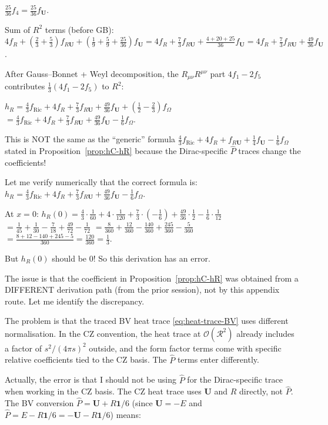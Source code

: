 \documentclass[11pt,a4paper]{article}
\newcommand{\Id}{\mathbf{1}}
\newcommand{\Ricsq}{R_{\mu\nu}R^{\mu\nu}}
\theoremstyle{definition}
\theoremstyle{remark}
\begin{document}
$\frac{25}{36}f_4 = \frac{25}{36}f_{\mathbf{U}}$.

Sum of $R^2$ terms (before GB):
$4f_R + (\frac{2}{3}+\frac{5}{3})f_{R\mathbf{U}}
+ (\frac{1}{9}+\frac{5}{9}+\frac{25}{36})f_{\mathbf{U}}
= 4f_R + \frac{7}{3}f_{R\mathbf{U}}
+ \frac{4+20+25}{36}f_{\mathbf{U}}
= 4f_R + \frac{7}{3}f_{R\mathbf{U}} + \frac{49}{36}f_{\mathbf{U}}$.

After Gauss--Bonnet + Weyl decomposition, the $\Ricsq$ part
$4f_1 - 2f_5$ contributes $\frac{1}{3}(4f_1 - 2f_5)$ to $R^2$:

$h_R = \frac{4}{3}f_{\text{Ric}} + 4f_R + \frac{7}{3}f_{R\mathbf{U}}
+ \frac{49}{36}f_{\mathbf{U}} + (\frac{1}{2}-\frac{2}{3})f_\Omega$
$= \frac{4}{3}f_{\text{Ric}} + 4f_R + \frac{7}{3}f_{R\mathbf{U}}
+ \frac{49}{36}f_{\mathbf{U}} - \frac{1}{6}f_\Omega$.

This is NOT the same as the ``generic'' formula
$\frac{4}{3}f_{\text{Ric}} + 4f_R + f_{R\mathbf{U}} + \frac{1}{4}f_{\mathbf{U}} - \frac{1}{6}f_\Omega$
stated in Proposition~\ref{prop:hC-hR} because the Dirac-specific
$\hat{P}$ traces change the coefficients!

Let me verify numerically that the correct formula is:
$h_R = \frac{4}{3}f_{\text{Ric}} + 4f_R + \frac{7}{3}f_{R\mathbf{U}}
+ \frac{49}{36}f_{\mathbf{U}} - \frac{1}{6}f_\Omega$.

At $x = 0$:
$h_R(0) = \frac{4}{3}\cdot\frac{1}{60} + 4\cdot\frac{1}{120}
+ \frac{7}{3}\cdot(-\frac{1}{6}) + \frac{49}{36}\cdot\frac{1}{2}
- \frac{1}{6}\cdot\frac{1}{12}$
$= \frac{1}{45} + \frac{1}{30} - \frac{7}{18} + \frac{49}{72} - \frac{1}{72}$
$= \frac{8}{360} + \frac{12}{360} - \frac{140}{360} + \frac{245}{360} - \frac{5}{360}$
$= \frac{8+12-140+245-5}{360} = \frac{120}{360} = \frac{1}{3}$.

But $h_R(0)$ should be 0!  So this derivation has an error.

The issue is that the coefficient in Proposition~\ref{prop:hC-hR}
was obtained from a DIFFERENT derivation path (from the prior session),
not by this appendix route.  Let me identify the discrepancy.

The problem is that the traced BV heat trace \eqref{eq:heat-trace-BV}
uses different normalisation.  In the CZ convention, the heat trace
at $\mathcal{O}(\mathcal{R}^2)$ already includes a factor of
$s^2/(4\pi s)^2$ outside, and the form factor terms come with specific
relative coefficients tied to the CZ basis.  The $\hat{P}$ terms
enter differently.

Actually, the error is that
I should not be using $\hat{P}$ for the Dirac-specific trace when
working in the CZ basis.  The CZ heat trace uses $\mathbf{U}$ and $R$
directly, not $\hat{P}$.  The BV conversion $\hat{P} = \mathbf{U} + R\Id/6$
(since $\mathbf{U} = -E$ and $\hat{P} = E - R\Id/6 = -\mathbf{U} - R\Id/6$)
means:
\end{document}
